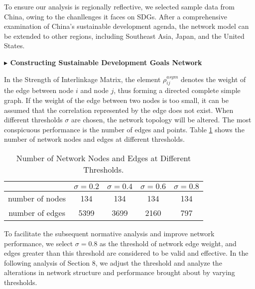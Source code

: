 \documentclass[12pt]{article}  %
\begin{document}
To ensure our analysis is regionally reflective, we selected sample data from China, owing to the chanllenges it faces on SDGs.
After a comprehensive examination of China's sustainable development agenda, the network model can be extended to other regions, including Southeast Asia, Japan, and the United States.




\vspace{0.7mm}\begin{itshape}
\textbf{$\blacktriangleright$ Constructing  Sustainable Development Goals Network }\end{itshape}


In the Strength of Interlinkage Matrix, the element $\rho_{ij}^{asym}$ denotes the weight of the edge between node $i$ and node $j$, thus forming a directed complete simple graph. If the weight of the edge between two nodes is too small, it can be assumed that the correlation represented by the edge does not exist. 
When different thresholds $\sigma$ are chosen, the network topology will be altered. The most conspicuous performance is the number of edges and points. Table \ref{tab:3.1}  shows the number of network nodes and edges at different thresholds.
\begin{table}[h]\vspace{-1.0em}
\centering \caption{Number of Network Nodes and Edges at Different Thresholds.}
\begin{tabular}{c|c|c|c|c}
\hline\hline
          & $\sigma=0.2$ & $\sigma=0.4$ & $\sigma=0.6$ & $\sigma=0.8$ \\ \hline\hline
number of nodes & 134 & 134 & 134 & 134\\ \hline
number of edges & 5399 & 3699 & 2160 & 797 \\ \hline\hline
\end{tabular}\vspace{-1.0em}\label{tab:3.1}
\end{table}

To facilitate the subsequent normative analysis and improve network performance, we select $\sigma=0.8$ as the threshold of network edge weight, and edges greater than this threshold are considered to be valid and effective. In the following analysis of Section 8, we adjust the threshold and analyze the alterations in network structure and performance brought about by varying thresholds.
\end{document}
